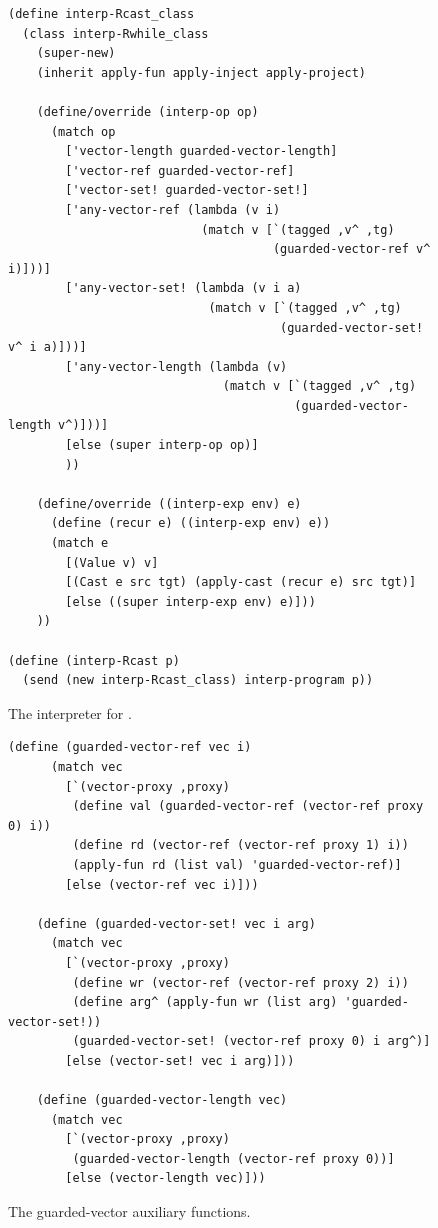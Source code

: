 \documentclass[7x10]{TimesAPriori_MIT}%
\begin{document}
\begin{figure}[tbp]
\begin{lstlisting}[basicstyle=\ttfamily\footnotesize]
(define interp-Rcast_class
  (class interp-Rwhile_class
    (super-new)
    (inherit apply-fun apply-inject apply-project)

    (define/override (interp-op op)
      (match op
        ['vector-length guarded-vector-length]
        ['vector-ref guarded-vector-ref]
        ['vector-set! guarded-vector-set!]
        ['any-vector-ref (lambda (v i)
                           (match v [`(tagged ,v^ ,tg)
                                     (guarded-vector-ref v^ i)]))]
        ['any-vector-set! (lambda (v i a)
                            (match v [`(tagged ,v^ ,tg)
                                      (guarded-vector-set! v^ i a)]))]
        ['any-vector-length (lambda (v)
                              (match v [`(tagged ,v^ ,tg)
                                        (guarded-vector-length v^)]))]
        [else (super interp-op op)]
        ))

    (define/override ((interp-exp env) e)
      (define (recur e) ((interp-exp env) e))
      (match e
        [(Value v) v]
        [(Cast e src tgt) (apply-cast (recur e) src tgt)]
        [else ((super interp-exp env) e)]))
    ))

(define (interp-Rcast p)
  (send (new interp-Rcast_class) interp-program p))
\end{lstlisting}
\caption{The interpreter for \LangCast{}.}
  \label{fig:interp-Rcast}
\end{figure}


\begin{figure}[tbp]
\begin{lstlisting}[basicstyle=\ttfamily\footnotesize]
    (define (guarded-vector-ref vec i)
      (match vec
        [`(vector-proxy ,proxy)
         (define val (guarded-vector-ref (vector-ref proxy 0) i))
         (define rd (vector-ref (vector-ref proxy 1) i))
         (apply-fun rd (list val) 'guarded-vector-ref)]
        [else (vector-ref vec i)]))
        
    (define (guarded-vector-set! vec i arg)
      (match vec
        [`(vector-proxy ,proxy)
         (define wr (vector-ref (vector-ref proxy 2) i))
         (define arg^ (apply-fun wr (list arg) 'guarded-vector-set!))
         (guarded-vector-set! (vector-ref proxy 0) i arg^)]
        [else (vector-set! vec i arg)]))
        
    (define (guarded-vector-length vec)
      (match vec
        [`(vector-proxy ,proxy)
         (guarded-vector-length (vector-ref proxy 0))]
        [else (vector-length vec)]))
\end{lstlisting}
\caption{The guarded-vector auxiliary functions.}
  \label{fig:guarded-vector}
\end{figure}
\end{document}
